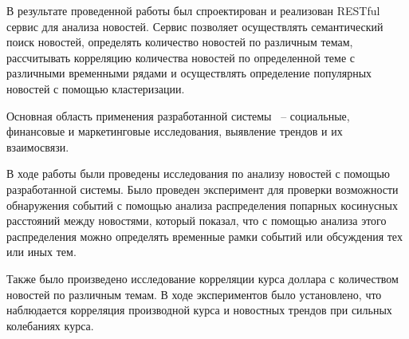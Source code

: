 
В результате проведенной работы был спроектирован и реализован RESTful сервис для анализа новостей. Сервис позволяет осуществлять семантический поиск новостей, определять количество новостей по различным темам, рассчитывать корреляцию количества новостей по определенной теме с различными временными рядами и осуществлять определение популярных новостей с помощью кластеризации.

Основная область применения разработанной системы ~-- социальные, финансовые и маркетинговые исследования, выявление трендов и их взаимосвязи.

В ходе работы были проведены исследования по анализу новостей с помощью разработанной системы. Было проведен эксперимент для проверки возможности обнаружения событий с помощью анализа распределения попарных косинусных расстояний между новостями, который показал, что с помощью анализа этого распределения можно определять временные рамки событий или обсуждения тех или иных тем.

Также было произведено исследование корреляции курса доллара с количеством новостей по различным темам. В ходе экспериментов было установлено, что наблюдается корреляция производной курса и новостных трендов при сильных колебаниях курса.

